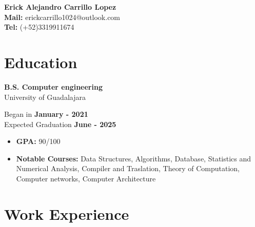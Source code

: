\documentclass[11pt]{article}
\begin{document}
 \thispagestyle{empty}
\begin{center}
\Large{\textbf{Erick Alejandro Carrillo Lopez} \\
  \textbf{Mail:} erickcarrillo1024@outlook.com\\
  \textbf{Tel:} (+52)3319911674}
\quad\quad \href{https://github.com/alecksandr26}{\color{blue}{Github}}
\quad\quad \href{https://www.linkedin.com/in/erick-alejandro-carrillo-lopez-988112219/}{\color{blue}{Linkedin}}
\quad\quad \href{https://youtube.com/@alecksandrborovkov7602?si=v-Wa1pnCIEAbWMbH}{\color{blue}{YouTube}}
\end{center}
\vspace{-1.4cm}
\section*{Education}
\vspace{-0.4cm}
\titlerule[0.3pt]
\vspace{-0.4cm}

\begin{multicols}{2}
  \noindent
  \textbf{B.S. Computer engineering}\\
  University of Guadalajara
  
  \columnbreak
  \noindent
  Began in \textbf{January - 2021}\\
  Expected Graduation \textbf{June -  2025}
\end{multicols}
\vspace{-0.3cm}
\begin{itemize}[noitemsep, nolistsep]
\item \textbf{GPA:} 90/100
\item \textbf{Notable Courses:} Data Structures, Algorithms, Database, Statistics and Numerical Analysis,
  Compiler and Traslation, Theory of Computation, Computer networks, Computer Architecture
\end{itemize}
\vspace{-0.4cm}


\section*{Work Experience}
\vspace{-0.4cm}
\titlerule[0.3pt]
\vspace{0.1cm}

\subsection*{\href{https://www.linkedin.com/feed/update/urn:li:activity:7225289702315073536/}{\color{blue}{SW Test Engineer Intern - Toshiba Global Commerce Solutions}}}
\vspace{-0.3cm}
\end{document}
